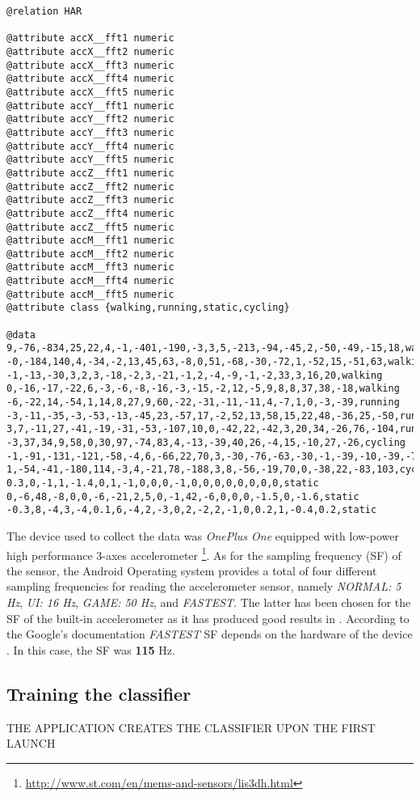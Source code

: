    
    
\begin{lstlisting}[caption=WEKA ARFF file extract,
label=weka-arff-code,captionpos=b, frame=single,basicstyle=\small,float,floatplacement=H,breaklines=true]
@relation HAR
    
@attribute accX__fft1 numeric
@attribute accX__fft2 numeric
@attribute accX__fft3 numeric
@attribute accX__fft4 numeric
@attribute accX__fft5 numeric
@attribute accY__fft1 numeric
@attribute accY__fft2 numeric
@attribute accY__fft3 numeric
@attribute accY__fft4 numeric
@attribute accY__fft5 numeric
@attribute accZ__fft1 numeric
@attribute accZ__fft2 numeric
@attribute accZ__fft3 numeric
@attribute accZ__fft4 numeric
@attribute accZ__fft5 numeric
@attribute accM__fft1 numeric
@attribute accM__fft2 numeric
@attribute accM__fft3 numeric
@attribute accM__fft4 numeric
@attribute accM__fft5 numeric
@attribute class {walking,running,static,cycling}
    
@data
9,-76,-834,25,22,4,-1,-401,-190,-3,3,5,-213,-94,-45,2,-50,-49,-15,18,walking
-0,-184,140,4,-34,-2,13,45,63,-8,0,51,-68,-30,-72,1,-52,15,-51,63,walking
-1,-13,-30,3,2,3,-18,-2,3,-21,-1,2,-4,-9,-1,-2,33,3,16,20,walking
0,-16,-17,-22,6,-3,-6,-8,-16,-3,-15,-2,12,-5,9,8,8,37,38,-18,walking
-6,-22,14,-54,1,14,8,27,9,60,-22,-31,-11,-11,4,-7,1,0,-3,-39,running
-3,-11,-35,-3,-53,-13,-45,23,-57,17,-2,52,13,58,15,22,48,-36,25,-50,running
3,7,-11,27,-41,-19,-31,-53,-107,10,0,-42,22,-42,3,20,34,-26,76,-104,running
-3,37,34,9,58,0,30,97,-74,83,4,-13,-39,40,26,-4,15,-10,27,-26,cycling
-1,-91,-131,-121,-58,-4,6,-66,22,70,3,-30,-76,-63,-30,-1,-39,-10,-39,-76,cycling
1,-54,-41,-180,114,-3,4,-21,78,-188,3,8,-56,-19,70,0,-38,22,-83,103,cycling
0.3,0,-1,1,-1.4,0,1,-1,0,0,0,-1,0,0,0,0,0,0,0,0,static
0,-6,48,-8,0,0,-6,-21,2,5,0,-1,42,-6,0,0,0,-1.5,0,-1.6,static
-0.3,8,-4,3,-4,0.1,6,-4,2,-3,0,2,-2,2,-1,0,0.2,1,-0.4,0.2,static
\end{lstlisting}
    
    The device used to collect the data was \textit{OnePlus One} equipped with low-power high performance 3-axes accelerometer \footnote{\url{http://www.st.com/en/mems-and-sensors/lis3dh.html}}. As for the sampling frequency (SF) of the sensor, the Android Operating system provides a total of four different sampling frequencies for reading the accelerometer sensor, namely \textit{NORMAL: 5 Hz}, \textit{UI: 16 Hz}, \textit{GAME: 50 Hz}, and \textit{FASTEST}. The latter has been chosen for the SF of the built-in accelerometer as it has produced good results in \citet[3-5]{lee2016}. According to the Google's documentation \textit{FASTEST} SF depends on the hardware of the device \citep{googlesensormanager2017}. In this case, the SF was \textbf{115} Hz. 
    
    \subsection{Training the classifier}
    THE APPLICATION CREATES THE CLASSIFIER UPON THE FIRST LAUNCH
    
    
    